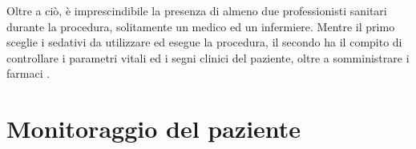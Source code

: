 Oltre a ciò, è imprescindibile la presenza di almeno due professionisti sanitari durante la procedura, solitamente un medico ed un infermiere. Mentre il primo sceglie i sedativi da utilizzare ed esegue la procedura, il secondo ha il compito di controllare i parametri vitali ed i segni clinici del paziente, oltre a somministrare i farmaci \cite{Krauss2006, Simeupsedazione}. 

\section{Monitoraggio del paziente}